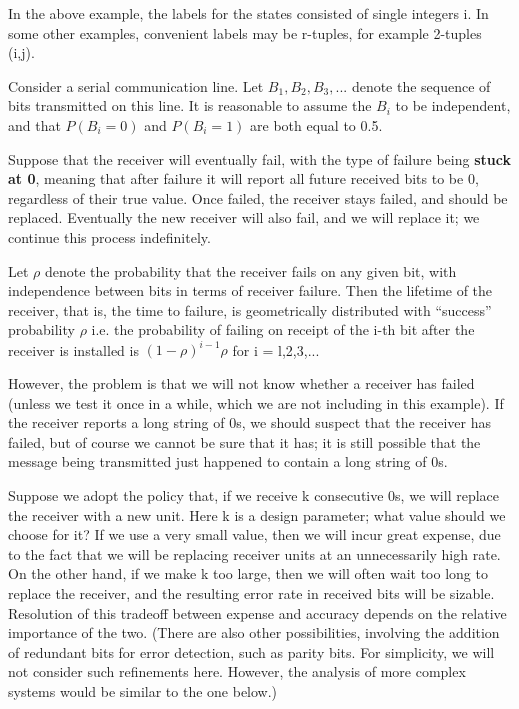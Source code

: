 In the above example, the labels for the states consisted of single
integers i. In some other examples, convenient labels may be r-tuples,
for example 2-tuples (i,j).

Consider a serial communication line. Let $B_{1},B_{2},B_{3},...$ denote
the sequence of bits transmitted on this line. It is reasonable to assume the
$B_{i}$ to be independent, and that $P(B_{i}=0)$ and $P(B_{i}=1)$ are
both equal to 0.5.

Suppose that the receiver will eventually fail, with the type of failure
being \textbf{stuck at 0}, meaning that after failure it will report all
future received bits to be 0, regardless of their true value. Once
failed, the receiver stays failed, and should be replaced. Eventually
the new receiver will also fail, and we will replace it; we continue
this process indefinitely.

Let $\rho$ denote the probability that the receiver fails on any given
bit, with independence between bits in terms of receiver failure.  Then
the lifetime of the receiver, that is, the time to failure, is
geometrically distributed with ``success'' probability $\rho $ i.e. the
probability of failing on receipt of the i-th bit after the receiver is
installed is $(1-\rho)^{i-1}\rho$ for i = l,2,3,... 

However, the problem is that we will not know whether a receiver has
failed (unless we test it once in a while, which we are not including in
this example).  If the receiver reports a long string of 0s, we should
suspect that the receiver has failed, but of course we cannot be sure
that it has; it is still possible that the message being transmitted
just happened to contain a long string of 0s.

Suppose we adopt the policy that, if we receive k consecutive 0s, we
will replace the receiver with a new unit. Here k is a design parameter;
what value should we choose for it? If we use a very small value, then
we will incur great expense, due to the fact that we will be replacing
receiver units at an unnecessarily high rate. On the other hand, if we
make k too large, then we will often wait too long to replace the
receiver, and the resulting error rate in received bits will be sizable.
Resolution of this tradeoff between expense and accuracy depends on the
relative importance of the two. (There are also other possibilities,
involving the addition of redundant bits for error detection, such as
parity bits. For simplicity, we will not consider such refinements here.
However, the analysis of more complex systems would be similar to the
one below.)

